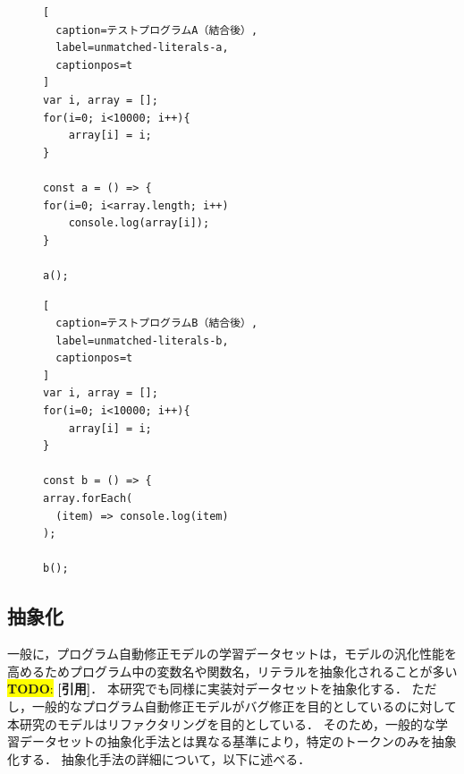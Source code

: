 \documentclass[11pt]{jreport}
\newcommand{\todo}[1]{\colorbox{yellow}{{\bf TODO}:}{\color{red} {\textbf{[#1]}}}}
\begin{document}
\begin{figure}[t]
\captionsetup{name=Listing}
\hspace{0.04\columnwidth}
\begin{minipage}[b]{0.445\linewidth}
\begin{lstlisting}[
  caption=テストプログラムA（結合後）,
  label=unmatched-literals-a,
  captionpos=t
]
var i, array = [];
for(i=0; i<10000; i++){
    array[i] = i;
}

const a = () => {
for(i=0; i<array.length; i++)
    console.log(array[i]);
}

a();
\end{lstlisting}
\end{minipage}
\hspace{0.059\columnwidth}
\begin{minipage}[b]{0.445\linewidth}
\begin{lstlisting}[
  caption=テストプログラムB（結合後）,
  label=unmatched-literals-b,
  captionpos=t
]
var i, array = [];
for(i=0; i<10000; i++){
    array[i] = i;
}

const b = () => {
array.forEach(
  (item) => console.log(item)
);

b();
\end{lstlisting}
\end{minipage}
\end{figure}




\subsection{抽象化}


一般に，プログラム自動修正モデルの学習データセットは，モデルの汎化性能を高めるためプログラム中の変数名や関数名，リテラルを抽象化されることが多い\todo{引用}．
本研究でも同様に実装対データセットを抽象化する．
ただし，一般的なプログラム自動修正モデルがバグ修正を目的としているのに対して本研究のモデルはリファクタリングを目的としている．
そのため，一般的な学習データセットの抽象化手法とは異なる基準により，特定のトークンのみを抽象化する．
抽象化手法の詳細について，以下に述べる．
\end{document}
